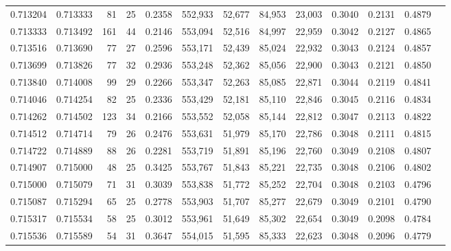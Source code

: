 \begin{tabular}{rrrrrrrrrrrrr}
0.713204 & 0.713333 &     81 &    25 &                                     0.2358 & 552,933 &  52,677 &  84,953 &  23,003 & 0.3040 & 0.2131 & 0.4879 \\
0.713333 & 0.713492 &    161 &    44 &                                     0.2146 & 553,094 &  52,516 &  84,997 &  22,959 & 0.3042 & 0.2127 & 0.4865 \\
0.713516 & 0.713690 &     77 &    27 &                                     0.2596 & 553,171 &  52,439 &  85,024 &  22,932 & 0.3043 & 0.2124 & 0.4857 \\
0.713699 & 0.713826 &     77 &    32 &                                     0.2936 & 553,248 &  52,362 &  85,056 &  22,900 & 0.3043 & 0.2121 & 0.4850 \\
0.713840 & 0.714008 &     99 &    29 &                                     0.2266 & 553,347 &  52,263 &  85,085 &  22,871 & 0.3044 & 0.2119 & 0.4841 \\
0.714046 & 0.714254 &     82 &    25 &                                     0.2336 & 553,429 &  52,181 &  85,110 &  22,846 & 0.3045 & 0.2116 & 0.4834 \\
0.714262 & 0.714502 &    123 &    34 &                                     0.2166 & 553,552 &  52,058 &  85,144 &  22,812 & 0.3047 & 0.2113 & 0.4822 \\
0.714512 & 0.714714 &     79 &    26 &                                     0.2476 & 553,631 &  51,979 &  85,170 &  22,786 & 0.3048 & 0.2111 & 0.4815 \\
0.714722 & 0.714889 &     88 &    26 &                                     0.2281 & 553,719 &  51,891 &  85,196 &  22,760 & 0.3049 & 0.2108 & 0.4807 \\
0.714907 & 0.715000 &     48 &    25 &                                     0.3425 & 553,767 &  51,843 &  85,221 &  22,735 & 0.3048 & 0.2106 & 0.4802 \\
0.715000 & 0.715079 &     71 &    31 &                                     0.3039 & 553,838 &  51,772 &  85,252 &  22,704 & 0.3048 & 0.2103 & 0.4796 \\
0.715087 & 0.715294 &     65 &    25 &                                     0.2778 & 553,903 &  51,707 &  85,277 &  22,679 & 0.3049 & 0.2101 & 0.4790 \\
0.715317 & 0.715534 &     58 &    25 &                                     0.3012 & 553,961 &  51,649 &  85,302 &  22,654 & 0.3049 & 0.2098 & 0.4784 \\
0.715536 & 0.715589 &     54 &    31 &                                     0.3647 & 554,015 &  51,595 &  85,333 &  22,623 & 0.3048 & 0.2096 & 0.4779 \\

\end{tabular}
